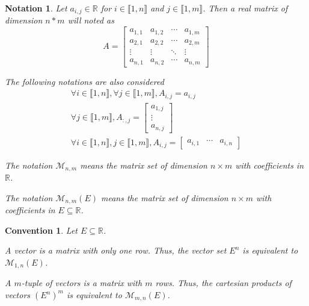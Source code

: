 \documentclass[11pt,en]{elegantpaper}
\newtheorem{convention}{Convention}
\newtheorem{notation}{Notation}
\newcommand{\Real}{\mathbb{R}}
\begin{document}
\begin{notation}
  Let $a_{i,j} \in \Real$ for $i \in \llbracket 1,n \rrbracket$ and $j \in \llbracket 1,m \rrbracket$.
  Then a real matrix of dimension $n * m$ will noted as \begin{equation*}
    A = \begin{bmatrix}
      a_{1,1} & a_{1,2} & \cdots & a_{1,m} \\
      a_{2,1} & a_{2,2} & \cdots & a_{2,m} \\
      \vdots & \vdots & \ddots & \vdots \\
      a_{n,1} & a_{n,2} & \cdots & a_{n,m}
    \end{bmatrix}
  \end{equation*}

  The following notations are also considered \begin{gather*}
    \forall i \in \llbracket 1,n \rrbracket, \forall j \in \llbracket 1,m \rrbracket, A_{i,j} = a_{i,j} \\
    \forall j \in \llbracket 1,m \rrbracket, A_{:,j} = \begin{bmatrix}
      a_{1,j} \\
      \vdots \\
      a_{n,j}
    \end{bmatrix} \\
    \forall i \in \llbracket 1,n \rrbracket, j \in \llbracket 1,m \rrbracket, A_{i,j} = \begin{bmatrix}
      a_{i,1} & \cdots & a_{i,n}
    \end{bmatrix}
  \end{gather*}

  The notation $\mathcal{M}_{n,m}$ means the matrix set of dimension $n \times m$ with coefficients in $\Real$. \par
  The notation $\mathcal{M}_{n,m}(E)$ means the matrix set of dimension $n \times m$ with coefficients in $E \subseteq \Real$.
\end{notation}

\begin{convention}
  Let $E \subseteq \Real$. \par
  A vector is a matrix with only one row. Thus, the vector set $E^n$ is equivalent to $\mathcal{M}_{1,n}(E)$. \par
  A $m$-tuple of vectors is a matrix with $m$ rows. Thus, the cartesian products of vectors $(E^n)^m$ is equivalent to $\mathcal{M}_{m,n}(E)$.
\end{convention}
\end{document}
